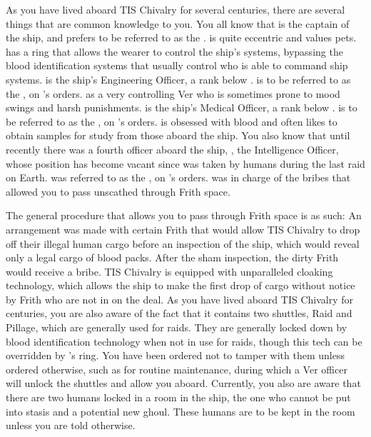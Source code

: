 \documentclass[blue]{guildcamp4}
\begin{document}
As you have lived aboard TIS Chivalry for several centuries, there are several things that are common knowledge to you. You all know that \cVone{} is the captain of the ship, and prefers to be referred to as the \cVone{\Duke}. \cVone{} is quite eccentric and values \cVone{\their} pets. \cVone{} has a ring that allows the wearer to control the ship's systems, bypassing the blood identification systems that usually control who is able to command ship systems. \cVtwo{} is the ship's Engineering Officer, a rank below \cVone{}. \cVtwo{} is to be referred to as the \cVtwo{\Marq}, on \cVone{}'s orders. \cVtwo{} as a very controlling Ver who is sometimes prone to mood swings and harsh punishments. \cVthree{} is the ship's Medical Officer, a rank below \cVtwo{}. \cVthree{} is to be referred to as the \cVthree{\Baron}, on \cVone{}'s orders. \cVthree{} is obsessed with blood and often likes to obtain samples for study from those aboard the ship. You also know that until recently there was a fourth officer aboard the ship, \cIntel{}, the Intelligence Officer, whose position has become vacant since \cIntel{\they} was taken by humans during the last raid on Earth. \cIntel{} was referred to as the \cIntel{\Count}, on \cVone{}'s orders. \cIntel{} was in charge of the bribes that allowed you to pass unscathed through Frith space.

The general procedure that allows you to pass through Frith space is as such: An arrangement was made with certain Frith that would allow TIS Chivalry to drop off their illegal human cargo before an inspection of the ship, which would reveal only a legal cargo of blood packs. After the sham inspection, the dirty Frith would receive a bribe. TIS Chivalry is equipped with unparalleled cloaking technology, which allows the ship to make the first drop of cargo without notice by Frith who are not in on the deal. As you have lived aboard TIS Chivalry for centuries, you are also aware of the fact that it contains two shuttles, Raid and Pillage, which are generally used for raids. They are generally locked down by blood identification technology when not in use for raids, though this tech can be overridden by \cVone{}'s ring. You have been ordered not to tamper with them unless ordered otherwise, such as for routine maintenance, during which a Ver officer will unlock the shuttles and allow you aboard. Currently, you also are aware that there are two humans locked in a room in the ship, the one who cannot be put into stasis and a potential new ghoul. These humans are to be kept in the room unless you are told otherwise.
\end{document}
